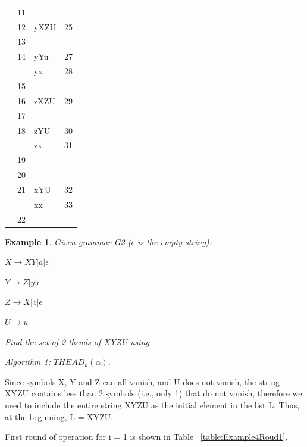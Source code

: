 \documentclass{sig-alternate-05-2015}
\newtheorem{SampleEnv}{Example}[section]
\begin{document}
\begin{table}[]
\begin{tabular}{|l|l|l|l|}
  & 11 &                   &                        \\
  & 12 & yXZU              & 25                     \\
  & 13 &                   &                        \\
  & 14 & yYu               & 27                     \\
  &    & yx                & 28                     \\
  & 15 &                   &                        \\
  & 16 & zXZU              & 29                     \\
  & 17 &                   &                        \\
  & 18 & zYU               & 30                     \\
  &    & zx                & 31                     \\
  & 19 &                   &                        \\
  & 20 &                   &                        \\
  & 21 & xYU               & 32                     \\
  &    & xx                & 33                     \\
  & 22 &                   &                       \\
\hline
\end{tabular}
\end{table}

\begin{SampleEnv}

Given grammar G2 ($\epsilon$ is the empty string): 

$X\rightarrow XY | a | \epsilon $

$Y\rightarrow Z | y | \epsilon$

$Z\rightarrow X | z | \epsilon$

$U\rightarrow u$

Find the set of 2-theads of XYZU using 

Algorithm 1:
$THEAD_k(\alpha)$.
\end{SampleEnv}

Since symbols X, Y and Z can all vanish, and U does
not vanish, the string XYZU contains less than 2 symbols
(i.e., only 1) that do not vanish, therefore we need to include
the entire string XYZU as the initial element in the
list L. Thus, at the beginning, L = {XYZU}.

First round of operation for i = 1 is shown in Table ~\ref{table:Example4Roud1}.
\end{document}
